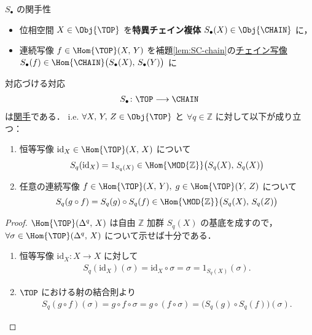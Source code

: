 \documentclass[algtopo_main]{subfiles}
\begin{document}
\begin{mytheo}[label=thm:cov-SS, breakable]{$S_\bullet$ の関手性}
    \begin{itemize}
        \item 位相空間 $X \in \Obj{\TOP}$ を\textbf{特異チェイン複体} $S_\bullet(X) \in \Obj{\CHAIN}$ に，
        \item 連続写像 $f \in \Hom{\TOP}(X,\, Y)$ を補題\ref{lem:SC-chain}の\hyperref[def:chainmap]{チェイン写像} $S_\bullet(f) \in \Hom{\CHAIN} \bigl( S_\bullet(X),\, S_\bullet (Y) \bigr)$ に
    \end{itemize}
    対応づける対応
    \begin{align}
        S_\bullet \colon \TOP \lto \CHAIN
    \end{align}
    は\hyperref[def:functor]{関手}である．
    i.e. $\forall X,\, Y,\, Z \in \Obj{\TOP}$ と $\forall q \in \mathbb{Z}$ に対して以下が成り立つ：
    \begin{enumerate}
        \item 恒等写像 $\mathrm{id}_X \in \Hom{\TOP}(X,\, X)$ について
        \begin{align}
            S_q(\mathrm{id}_X) = 1_{S_q(X)} \in \Hom{\MOD{\mathbb{Z}}}\bigl( S_q(X),\, S_q(X) \bigr) 
        \end{align}
        \item 任意の連続写像 $f \in \Hom{\TOP}(X,\, Y),\; g \in \Hom{\TOP}(Y,\, Z)$ について
        \begin{align}
            S_q(g\circ f)= S_q(g) \circ S_q(f) \in \Hom{\MOD{\mathbb{Z}}}\bigl( S_q(X),\, S_q(Z) \bigr) 
        \end{align}
    \end{enumerate}
\end{mytheo}

\begin{proof}
    $\Hom{\TOP}(\Delta^q,\, X)$ は自由 $\mathbb{Z}$ 加群 $S_q(X)$ の基底を成すので，$\forall \sigma \in \Hom{\TOP}(\Delta^q,\, X)$ について示せば十分である．
    \begin{enumerate}
        \item 恒等写像 $\mathrm{id}_X \colon X \to X$ に対して
        \begin{align}
            S_q(\mathrm{id}_X)(\sigma) = \mathrm{id}_X \circ \sigma = \sigma = 1_{S_q(X)}(\sigma).
        \end{align}
        \item $\TOP$ における射の結合則より
        \begin{align}
            S_q(g \circ f) (\sigma) = g \circ f \circ \sigma = g \circ (f \circ \sigma) = \bigl( S_q(g) \circ S_q(f)\bigr)(\sigma).
        \end{align}
    \end{enumerate}
\end{proof}
\end{document}
